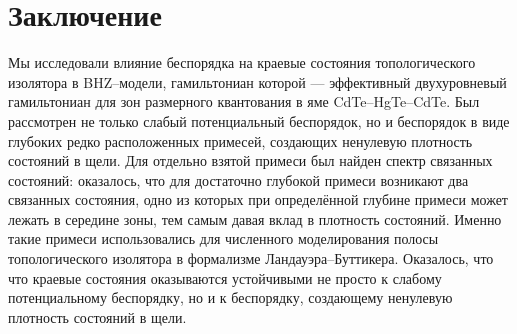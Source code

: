 \newpage
\section{Заключение}
Мы исследовали влияние беспорядка на краевые состояния топологического 
изолятора в BHZ--модели, гамильтониан которой
--- эффективный двухуровневый гамильтониан для зон размерного квантования в яме 
CdTe--HgTe--CdTe. Был рассмотрен не только слабый потенциальный беспорядок, но и беспорядок 
в виде глубоких редко расположенных примесей, создающих ненулевую плотность состояний в щели.
Для отдельно взятой примеси был найден спектр связанных состояний: оказалось, что для
достаточно глубокой примеси возникают два связанных состояния, одно из которых при определённой
глубине примеси может лежать в середине зоны, тем самым давая вклад в плотность состояний. 
Именно такие примеси использовались 
для численного моделирования полосы топологического изолятора в 
формализме Ландауэра--Буттикера. Оказалось, что 
что краевые состояния оказываются устойчивыми не просто к слабому потенциальному беспорядку, 
но и к беспорядку, создающему ненулевую плотность состояний в щели. 
